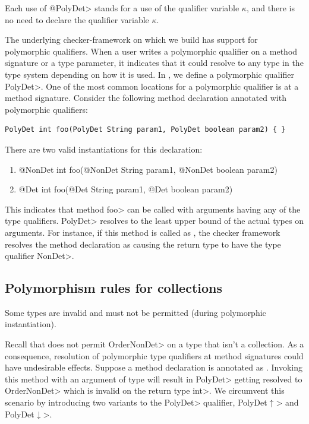 Each use of \<@PolyDet> stands for a use of the qualifier variable
$\kappa$, and there is no need to declare the qualifier variable $\kappa$.



The underlying checker-framework on which we build \theDeterminismChecker has support for
polymorphic qualifiers. When a user writes a polymorphic qualifier on a method signature or a type parameter,
it indicates that it could resolve to any type in the type system depending on how it is used.
In \theDeterminismChecker, we define a polymorphic qualifier \<PolyDet>.
One of the most common locations for a polymorphic qualifier is at a method signature.
Consider the following method declaration annotated with polymorphic qualifiers:
\begin{verbatim}
PolyDet int foo(PolyDet String param1, PolyDet boolean param2) { }
\end{verbatim}
There are two valid instantiations for this declaration:
\begin{enumerate}
    \item @NonDet int foo(@NonDet String param1, @NonDet boolean param2) { }
    \item @Det int foo(@Det String param1, @Det boolean param2) { }
\end{enumerate}
This indicates that method \<foo> can be called with arguments having any of the  type qualifiers.
 \<PolyDet> resolves to the least upper bound of
the actual types on arguments. For instance, if this method is called as , the 
checker framework resolves the method declaration as 
causing the return type to have the type qualifier \<NonDet>.

\subsection{Polymorphism rules for collections}\label{polymorphism-up-down}

Some types are invalid and must not be permitted (during polymorphic instantiation).

Recall that \theDeterminismChecker does not permit \<OrderNonDet> on a type
that isn't a collection.
As a consequence, resolution of polymorphic type qualifiers at method signatures could have undesirable effects.
Suppose a method declaration is annotated as . Invoking this method
with an argument of type  will result in \<PolyDet> getting resolved to \<OrderNonDet> which is invalid
on the return type \<int>. We circumvent this scenario by introducing two variants to the \<PolyDet> qualifier, \<PolyDet$\uparrow$>
and \<PolyDet$\downarrow$>. 

